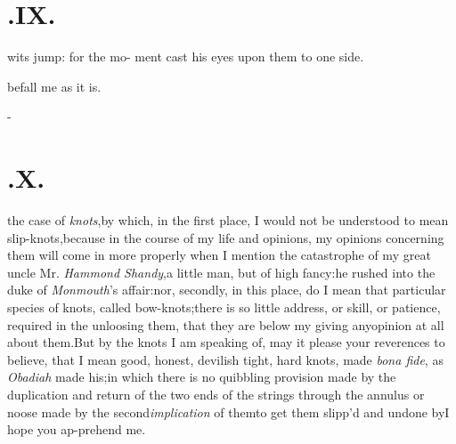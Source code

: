 \documentclass{article}
\begin{document}
\section{.\quad  IX.}

 wits jump: for the mo-\break 
ment \drslop cast his eyes upon\break
{}
them to one side.

befall me as it is.

\null\kern-\baselineskip
\section{.\quad  X.}

 the case of \textit{knots},\tsh by which, in\break
the first place, I would not be under\-stood to mean slip-knots,\tsk because in the course of my life and
opinions,\tsh\break
my opinions concerning them will come in more properly when I mention the
catastrophe of my great uncle Mr.  \textit{Hammond Shandy},\tsk a little man,\tsk
but of\break
high fancy:\tsk he rushed into the duke of \textit{Monmouth}’s affair:\tsh nor,
secondly, in this place, do I mean that particular species of knots, called
bow-knots;\tsk there is so little address, or skill, or patience, required in the
unloosing them, that they are below my giving any\break opinion at all about them.\tsk But
by the knots I am speaking of, may it please your reverences to believe, that I
mean
good, honest, devilish tight, hard knots, made \textit{bona fide}, as
\textit{Obadiah} made his;\tsh in which there is no quibbling provision made by the
duplication and return of the two ends of the strings through the annulus or noose
made by the second\break\textit{implication} of them\tsk to get them slipp’d and
undone by\tsh\tsh I hope you ap-\break prehend me.
\end{document}

